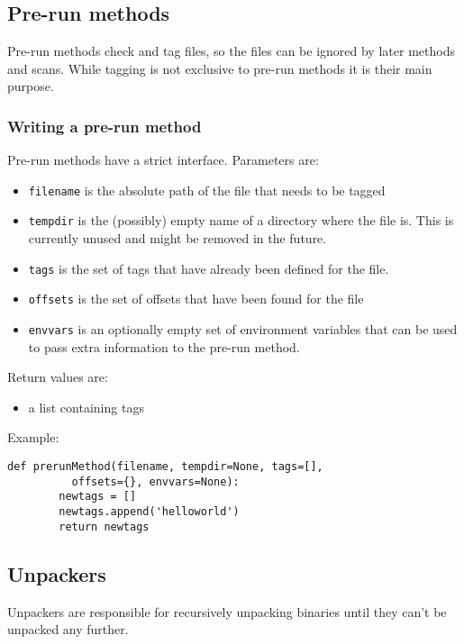\documentclass[10pt]{article}
\begin{document}
\subsection{Pre-run methods}

Pre-run methods check and tag files, so the files can be ignored by later
methods and scans. While tagging is not exclusive to pre-run methods it is
their main purpose.

\subsubsection{Writing a pre-run method}

Pre-run methods have a strict interface. Parameters are:

\begin{itemize}
\item \texttt{filename} is the absolute path of the file that needs to be tagged
\item \texttt{tempdir} is the (possibly) empty name of a directory where the
file is. This is currently unused and might be removed in the future.
\item \texttt{tags} is the set of tags that have already been defined for the
file.
\item \texttt{offsets} is the set of offsets that have been found for the file
\item \texttt{envvars} is an optionally empty set of environment variables that
can be used to pass extra information to the pre-run method.
\end{itemize}

Return values are:

\begin{itemize}
\item a list containing tags
\end{itemize}

Example:

\begin{verbatim}
def prerunMethod(filename, tempdir=None, tags=[],
          offsets={}, envvars=None):
        newtags = []
        newtags.append('helloworld')
        return newtags
\end{verbatim}

\subsection{Unpackers}

Unpackers are responsible for recursively unpacking binaries until they
can't be unpacked any further.
\end{document}
